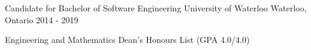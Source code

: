 \begin{cventries}
  \cventry
    {Candidate for Bachelor of Software Engineering}
    {University of Waterloo}
    {Waterloo, Ontario}
    {2014 - 2019}
    {
      \begin{cvitems}
      \item Engineering and Mathematics Dean’s Honours List (GPA 4.0/4.0)
      \end{cvitems}
    }
\end{cventries}
